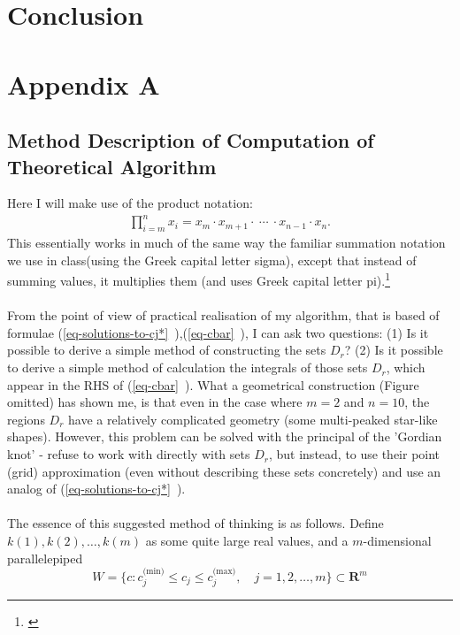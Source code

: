 \documentclass[11pt,a4paper]{article}
\numberwithin{equation}{subsection}
\begin{document}
\section{Conclusion}


\newpage

\section{Appendix A} \label{apendix}
\subsection{Method Description of Computation of Theoretical Algorithm}

Here I will make use of the product notation:
\begin{gather*}
\prod\limits_{i = m}^{n} x_{i} = x_{m} \cdot x_{m+1} \cdot \  \cdots \  \cdot x_{n-1} \cdot x_{n}.
\end{gather*}
This essentially works in much of the same way the familiar summation notation we use in class(using the Greek capital letter sigma), except that instead of summing values, it multiplies them (and uses Greek capital letter pi).\footnote{\cite{product_1995}}\\
\\
From the point of view of practical realisation of my algorithm, that is based of formulae (\vref{eq-solutions-to-cj*}~),(\vref{eq-cbar}~), I can ask two questions: (1) Is it possible to derive a simple method of constructing the sets $D_{r}$? (2) Is it possible to derive a simple method of calculation the integrals of those sets $D_{r}$, which appear in the RHS of (\vref{eq-cbar}~). What a geometrical construction (Figure omitted) has shown me, is that even in the case where $m=2$ and $n=10$, the regions $D_{r}$ have a relatively complicated geometry (some multi-peaked star-like shapes). However, this problem can be solved with the principal of the 'Gordian knot' - refuse to work with directly with sets $D_{r}$, but instead, to use their point (grid) approximation (even without describing these sets concretely) and use an analog of (\vref{eq-solutions-to-cj*}~).\\
\\
The essence of this suggested method of thinking is as follows. Define $k(1),k(2),\dots,k(m)$ as some quite large real values, and a $m$-dimensional parallelepiped
\begin{equation}
W=\{ c:c_{j}^{(\text{min)}} \leq c_{j} \leq c_{j}^{(\text{max)}}, \quad j=1,2,\dots,m \}\subset \boldsymbol{R}^{m}
\end{equation}
\end{document}
